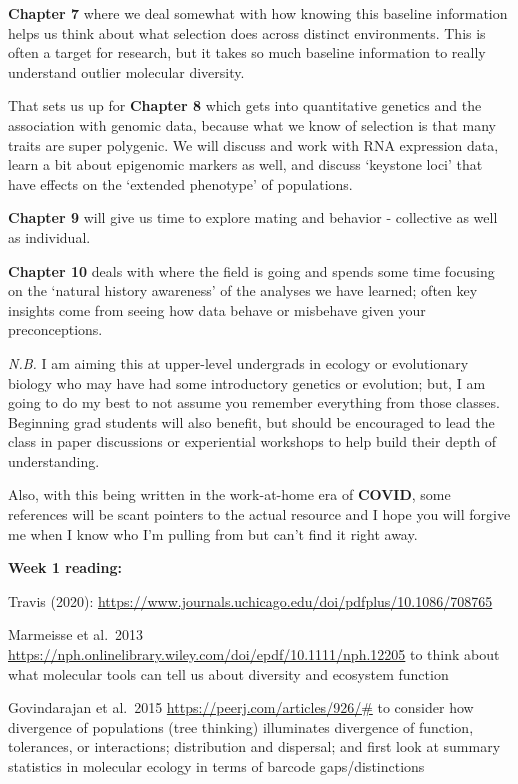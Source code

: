 \documentclass[
]{article}
\begin{document}
\textbf{Chapter 7} where we deal somewhat with how knowing this baseline
information helps us think about what selection does across distinct
environments. This is often a target for research, but it takes so much
baseline information to really understand outlier molecular diversity.

That sets us up for \textbf{Chapter 8} which gets into quantitative
genetics and the association with genomic data, because what we know of
selection is that many traits are super polygenic. We will discuss and
work with RNA expression data, learn a bit about epigenomic markers as
well, and discuss `keystone loci' that have effects on the `extended
phenotype' of populations.

\textbf{Chapter 9} will give us time to explore mating and behavior -
collective as well as individual.

\textbf{Chapter 10} deals with where the field is going and spends some
time focusing on the `natural history awareness' of the analyses we have
learned; often key insights come from seeing how data behave or
misbehave given your preconceptions.

\emph{N.B.} I am aiming this at upper-level undergrads in ecology or
evolutionary biology who may have had some introductory genetics or
evolution; but, I am going to do my best to not assume you remember
everything from those classes. Beginning grad students will also
benefit, but should be encouraged to lead the class in paper discussions
or experiential workshops to help build their depth of understanding.

Also, with this being written in the work-at-home era of \textbf{COVID},
some references will be scant pointers to the actual resource and I hope
you will forgive me when I know who I'm pulling from but can't find it
right away.

\textbf{Week 1 reading:}

Travis (2020):
\url{https://www.journals.uchicago.edu/doi/pdfplus/10.1086/708765}

Marmeisse et al.~2013
\url{https://nph.onlinelibrary.wiley.com/doi/epdf/10.1111/nph.12205} to
think about what molecular tools can tell us about diversity and
ecosystem function

Govindarajan et al.~2015 \url{https://peerj.com/articles/926/\#} to
consider how divergence of populations (tree thinking) illuminates
divergence of function, tolerances, or interactions; distribution and
dispersal; and first look at summary statistics in molecular ecology in
terms of barcode gaps/distinctions
\end{document}
